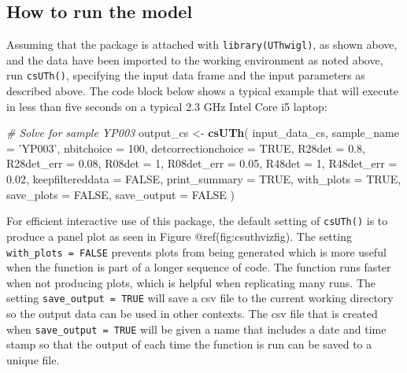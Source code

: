 \documentclass[]{elsarticle} %
\newenvironment{Shaded}{\begin{snugshade}}{\end{snugshade}}
\newcommand{\CommentTok}[1]{\textcolor[rgb]{0.56,0.35,0.01}{\textit{#1}}}
\newcommand{\DataTypeTok}[1]{\textcolor[rgb]{0.13,0.29,0.53}{#1}}
\newcommand{\DecValTok}[1]{\textcolor[rgb]{0.00,0.00,0.81}{#1}}
\newcommand{\FloatTok}[1]{\textcolor[rgb]{0.00,0.00,0.81}{#1}}
\newcommand{\KeywordTok}[1]{\textcolor[rgb]{0.13,0.29,0.53}{\textbf{#1}}}
\newcommand{\NormalTok}[1]{#1}
\newcommand{\OtherTok}[1]{\textcolor[rgb]{0.56,0.35,0.01}{#1}}
\newcommand{\StringTok}[1]{\textcolor[rgb]{0.31,0.60,0.02}{#1}}
\begin{document}
\hypertarget{how-to-run-the-model}{%
\subsection{How to run the model}\label{how-to-run-the-model}}

Assuming that the package is attached with \texttt{library(UThwigl)}, as shown above, and the data have been imported to the working environment as noted above, run \texttt{csUTh()}, specifying the input data frame and the input parameters as described above. The code block below shows a typical example that will execute in less than five seconds on a typical 2.3 GHz Intel Core i5 laptop:

\begin{Shaded}
\begin{Highlighting}[]
\CommentTok{# Solve for sample YP003}
\NormalTok{output_cs <-}
\StringTok{  }\KeywordTok{csUTh}\NormalTok{(}
\NormalTok{    input_data_cs,}
    \DataTypeTok{sample_name =} \StringTok{'YP003'}\NormalTok{,}
    \DataTypeTok{nbitchoice =} \DecValTok{100}\NormalTok{,}
    \DataTypeTok{detcorrectionchoice =} \OtherTok{TRUE}\NormalTok{,}
    \DataTypeTok{R28det =} \FloatTok{0.8}\NormalTok{,}
    \DataTypeTok{R28det_err =} \FloatTok{0.08}\NormalTok{,}
    \DataTypeTok{R08det =} \DecValTok{1}\NormalTok{,}
    \DataTypeTok{R08det_err =} \FloatTok{0.05}\NormalTok{,}
    \DataTypeTok{R48det =} \DecValTok{1}\NormalTok{,}
    \DataTypeTok{R48det_err =} \FloatTok{0.02}\NormalTok{,}
    \DataTypeTok{keepfiltereddata =} \OtherTok{FALSE}\NormalTok{,}
    \DataTypeTok{print_summary =} \OtherTok{TRUE}\NormalTok{,}
    \DataTypeTok{with_plots =} \OtherTok{TRUE}\NormalTok{,}
    \DataTypeTok{save_plots =} \OtherTok{FALSE}\NormalTok{,}
    \DataTypeTok{save_output =} \OtherTok{FALSE}
\NormalTok{  )}
\end{Highlighting}
\end{Shaded}

For efficient interactive use of this package, the default setting of \texttt{csUTh()} is to produce a panel plot as seen in Figure @ref(fig:csuthvizfig). The setting \texttt{with\_plots\ =\ FALSE} prevents plots from being generated which is more useful when the function is part of a longer sequence of code. The function runs faster when not producing plots, which is helpful when replicating many runs. The setting \texttt{save\_output\ =\ TRUE} will save a csv file to the current working directory so the output data can be used in other contexts. The csv file that is created when \texttt{save\_output\ =\ TRUE} will be given a name that includes a date and time stamp so that the output of each time the function is run can be saved to a unique file.
\end{document}
